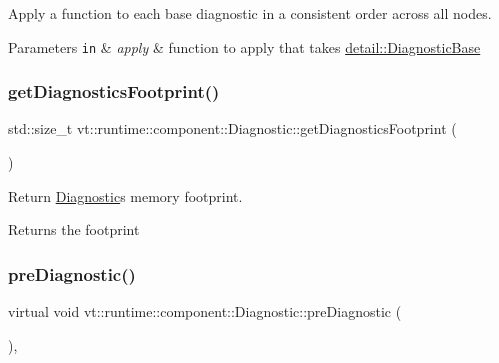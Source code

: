 Apply a function to each base diagnostic in a consistent order across all nodes. 


\begin{DoxyParams}[1]{Parameters}
\mbox{\tt in}  & {\em apply} & function to apply that takes {\ttfamily \hyperlink{structvt_1_1runtime_1_1component_1_1detail_1_1_diagnostic_base}{detail\+::\+Diagnostic\+Base}} \\
\hline
\end{DoxyParams}
\mbox{\label{structvt_1_1runtime_1_1component_1_1_diagnostic_a9c1f4174ac87bb6ae0ec186a08adbbbb}} 
\subsubsection{\texorpdfstring{get\+Diagnostics\+Footprint()}{getDiagnosticsFootprint()}}
{\footnotesize\ttfamily std\+::size\+\_\+t vt\+::runtime\+::component\+::\+Diagnostic\+::get\+Diagnostics\+Footprint (\begin{DoxyParamCaption}{ }\end{DoxyParamCaption})}



Return \hyperlink{structvt_1_1runtime_1_1component_1_1_diagnostic}{Diagnostic}\textquotesingle{}s memory footprint. 

\begin{DoxyReturn}{Returns}
the footprint 
\end{DoxyReturn}
\mbox{\label{structvt_1_1runtime_1_1component_1_1_diagnostic_a4e64b5a12ffc1874065aa8b09e6309a9}} 
\subsubsection{\texorpdfstring{pre\+Diagnostic()}{preDiagnostic()}}
{\footnotesize\ttfamily virtual void vt\+::runtime\+::component\+::\+Diagnostic\+::pre\+Diagnostic (\begin{DoxyParamCaption}{ }\end{DoxyParamCaption})\hspace{0.3cm}{\ttfamily [inline]}, {\ttfamily [virtual]}}



